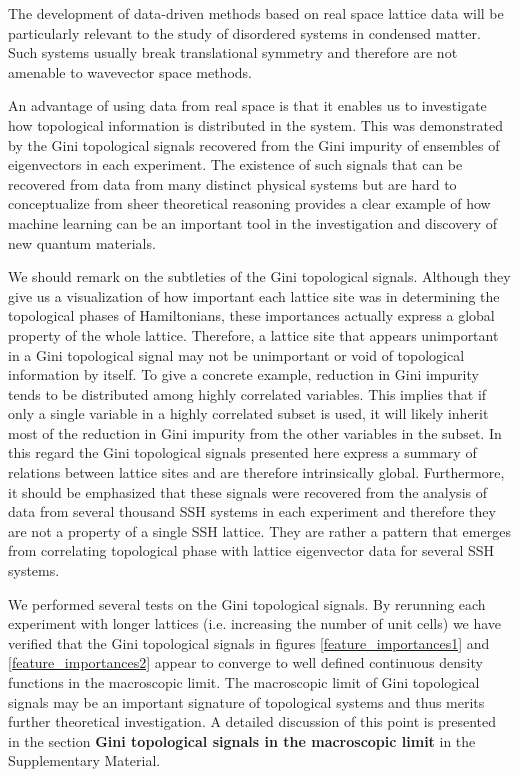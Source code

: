 \documentclass[fleqn,10pt]{wlscirep}
\begin{document}
The development of data-driven methods based on real space lattice data will be particularly relevant to the study of disordered systems in condensed matter. Such systems usually break translational symmetry and therefore are not amenable to wavevector space methods.

An advantage of using data from real space is that it enables us to investigate how topological information is distributed in the system. This was demonstrated by the Gini topological signals recovered from the Gini impurity of ensembles of eigenvectors in each experiment. The existence of such signals that can be recovered from data from many distinct physical systems but are hard to conceptualize from sheer theoretical reasoning provides a clear example of how machine learning can be an important tool in the investigation and discovery of new quantum materials.

We should remark on the subtleties of the Gini topological signals. Although they give us a visualization of how important each lattice site was in determining the topological phases of Hamiltonians, these importances actually express a global property of the whole lattice. Therefore, a lattice site that appears unimportant in a Gini topological signal may not be unimportant or void of topological information by itself. To give a concrete example, reduction in Gini impurity tends to be distributed among highly correlated variables. This implies that if only a single variable in a highly correlated subset is used, it will likely inherit most of the reduction in Gini impurity from the other variables in the subset. In this regard the Gini topological signals presented here express a summary of relations between lattice sites and are therefore intrinsically global. Furthermore, it should be emphasized that these signals were recovered from the analysis of data from several thousand SSH systems in each experiment and therefore they are not a property of a single SSH lattice. They are rather a pattern that emerges from correlating topological phase with lattice eigenvector data for several SSH systems.   

We performed several tests on the Gini topological signals. By rerunning each experiment with longer lattices (i.e. increasing the number of unit cells) we have verified that the Gini topological signals in figures \ref{feature_importances1} and \ref{feature_importances2} appear to converge to well defined continuous density functions in the macroscopic limit. The macroscopic limit of Gini topological signals may be an important signature of topological systems and thus merits further theoretical investigation. A detailed discussion of this point is presented in the section \textbf{Gini topological signals in the macroscopic limit} in the Supplementary Material.
\end{document}
